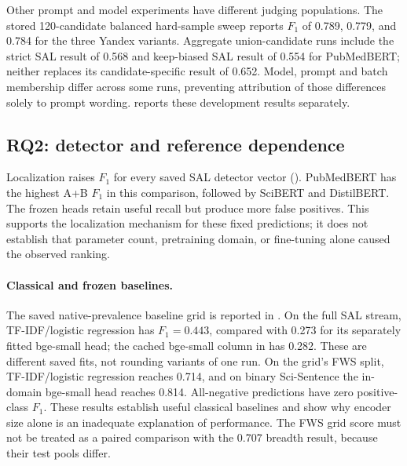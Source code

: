Other prompt and model experiments have different judging populations. The stored
120-candidate balanced hard-sample sweep reports $F_1$ of 0.789, 0.779, and 0.784 for the three
Yandex variants. Aggregate union-candidate runs include the strict SAL result of 0.568 and
keep-biased SAL result of 0.554 for PubMedBERT; neither replaces its candidate-specific result
of 0.652. Model, prompt and batch membership differ across some runs, preventing attribution
of those differences solely to prompt wording.  reports these development
results separately.

\subsection{RQ2: detector and reference dependence}

\begin{table}[t]
\centering
\small
\caption{Eight saved SAL detector vectors scored on the full stream and after the same
Discussion/Conclusion gate. These are positive-class metrics; the artifact permits metric
recomputation but does not fully reconstruct each training job.}
\label{T:sal-detectors}

\end{table}

Localization raises $F_1$ for every saved SAL detector vector ().
PubMedBERT has the highest A+B $F_1$ in this comparison, followed by SciBERT and DistilBERT.
The frozen heads retain useful recall but produce more false positives. This supports the
localization mechanism for these fixed predictions; it does not establish that parameter count,
pretraining domain, or fine-tuning alone caused the observed ranking.

\paragraph{Classical and frozen baselines.}
The saved native-prevalence baseline grid is reported in . On the full
SAL stream, TF-IDF/logistic regression has $F_1=0.443$, compared with 0.273 for its separately
fitted bge-small head; the cached bge-small column in  has 0.282. These are
different saved fits, not rounding variants of one run. On the grid's FWS split, TF-IDF/logistic
regression reaches 0.714, and on binary Sci-Sentence the in-domain bge-small head reaches 0.814.
All-negative predictions have zero positive-class $F_1$. These results establish useful
classical baselines and show why encoder size alone is an inadequate explanation of performance.
The FWS grid score must not be treated as a paired comparison with the 0.707 breadth result,
because their test pools differ.

